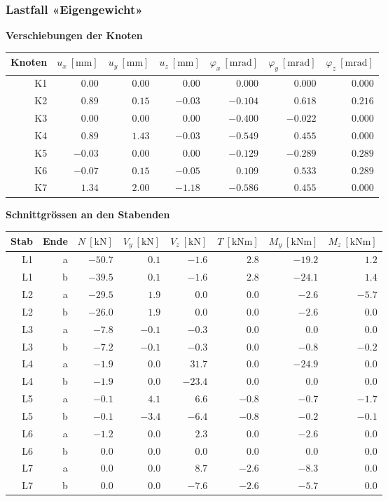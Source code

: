 \documentclass[11pt,a4paper]{article}
\begin{document}
\subsubsection{Lastfall «Eigengewicht»}
\noindent\textbf{Verschiebungen der Knoten}
\begin{longtable}{rrrrrrr}
\hline
Knoten & $u_x\ [\mathrm{mm}]$ & $u_y\ [\mathrm{mm}]$ & $u_z\ [\mathrm{mm}]$ & $\varphi_x\ [\mathrm{mrad}]$ & $\varphi_y\ [\mathrm{mrad}]$ & $\varphi_z\ [\mathrm{mrad}]$ \\
\hline
\endhead
K1 & $0.00$ & $0.00$ & $0.00$ & $0.000$ & $0.000$ & $0.000$ \\
K2 & $0.89$ & $0.15$ & $-0.03$ & $-0.104$ & $0.618$ & $0.216$ \\
K3 & $0.00$ & $0.00$ & $0.00$ & $-0.400$ & $-0.022$ & $0.000$ \\
K4 & $0.89$ & $1.43$ & $-0.03$ & $-0.549$ & $0.455$ & $0.000$ \\
K5 & $-0.03$ & $0.00$ & $0.00$ & $-0.129$ & $-0.289$ & $0.289$ \\
K6 & $-0.07$ & $0.15$ & $-0.05$ & $0.109$ & $0.533$ & $0.289$ \\
K7 & $1.34$ & $2.00$ & $-1.18$ & $-0.586$ & $0.455$ & $0.000$ \\
\hline
\end{longtable}
\noindent\textbf{Schnittgrössen an den Stabenden}
\begin{longtable}{rrrrrrrr}
\hline
Stab & Ende & $N\ [\mathrm{kN}]$ & $V_y\ [\mathrm{kN}]$ & $V_z\ [\mathrm{kN}]$ & $T\ [\mathrm{kNm}]$ & $M_y\ [\mathrm{kNm}]$ & $M_z\ [\mathrm{kNm}]$ \\
\hline
\endhead
L1 & a & $-50.7$ & $0.1$ & $-1.6$ & $2.8$ & $-19.2$ & $1.2$ \\
L1 & b & $-39.5$ & $0.1$ & $-1.6$ & $2.8$ & $-24.1$ & $1.4$ \\
L2 & a & $-29.5$ & $1.9$ & $0.0$ & $0.0$ & $-2.6$ & $-5.7$ \\
L2 & b & $-26.0$ & $1.9$ & $0.0$ & $0.0$ & $-2.6$ & $0.0$ \\
L3 & a & $-7.8$ & $-0.1$ & $-0.3$ & $0.0$ & $0.0$ & $0.0$ \\
L3 & b & $-7.2$ & $-0.1$ & $-0.3$ & $0.0$ & $-0.8$ & $-0.2$ \\
L4 & a & $-1.9$ & $0.0$ & $31.7$ & $0.0$ & $-24.9$ & $0.0$ \\
L4 & b & $-1.9$ & $0.0$ & $-23.4$ & $0.0$ & $0.0$ & $0.0$ \\
L5 & a & $-0.1$ & $4.1$ & $6.6$ & $-0.8$ & $-0.7$ & $-1.7$ \\
L5 & b & $-0.1$ & $-3.4$ & $-6.4$ & $-0.8$ & $-0.2$ & $-0.1$ \\
L6 & a & $-1.2$ & $0.0$ & $2.3$ & $0.0$ & $-2.6$ & $0.0$ \\
L6 & b & $0.0$ & $0.0$ & $0.0$ & $0.0$ & $0.0$ & $0.0$ \\
L7 & a & $0.0$ & $0.0$ & $8.7$ & $-2.6$ & $-8.3$ & $0.0$ \\
L7 & b & $0.0$ & $0.0$ & $-7.6$ & $-2.6$ & $-5.7$ & $0.0$ \\
\hline
\end{longtable}
\end{document}
